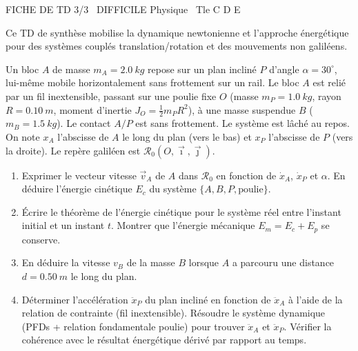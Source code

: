 \documentclass[11pt]{article}
\begin{document}
\begin{tcolorbox}[enhanced,colback=popink,colframe=popink,arc=10pt,boxrule=0pt,left=12pt,right=12pt,top=9pt,bottom=9pt]
{\color{white}\popxbold\small FICHE DE TD 3/3 \textbullet\ DIFFICILE \hfill Physique \textbullet\ Tle C D E\par}
\end{tcolorbox}
\vspace{4pt}
Ce TD de synthèse mobilise la dynamique newtonienne et l'approche énergétique pour des systèmes couplés translation/rotation et des mouvements non galiléens.

\begin{exercice}
Un bloc $A$ de masse $m_A = \SI{2,0}{kg}$ repose sur un plan incliné $P$ d'angle $\alpha = 30^\circ$, lui-même mobile horizontalement sans frottement sur un rail. Le bloc $A$ est relié par un fil inextensible, passant sur une poulie fixe $O$ (masse $m_P = \SI{1,0}{kg}$, rayon $R = \SI{0,10}{m}$, moment d'inertie $J_O = \frac{1}{2}m_P R^2$), à une masse suspendue $B$ ($m_B = \SI{1,5}{kg}$). Le contact $A/P$ est sans frottement. Le système est lâché au repos. On note $x_A$ l'abscisse de $A$ le long du plan (vers le bas) et $x_P$ l'abscisse de $P$ (vers la droite). Le repère galiléen est $\mathcal{R}_0(O, \vec{\imath}, \vec{\jmath})$.
\begin{enumerate}
    \item Exprimer le vecteur vitesse $\vec{v}_A$ de $A$ dans $\mathcal{R}_0$ en fonction de $\dot{x}_A$, $\dot{x}_P$ et $\alpha$. En déduire l'énergie cinétique $E_c$ du système $\{A, B, P, \text{poulie}\}$.
    \item Écrire le théorème de l'énergie cinétique pour le système réel entre l'instant initial et un instant $t$. Montrer que l'énergie mécanique $E_m = E_c + E_p$ se conserve.
    \item En déduire la vitesse $v_B$ de la masse $B$ lorsque $A$ a parcouru une distance $d = \SI{0,50}{m}$ le long du plan.
    \item Déterminer l'accélération $\ddot{x}_P$ du plan incliné en fonction de $\ddot{x}_A$ à l'aide de la relation de contrainte (fil inextensible). Résoudre le système dynamique (PFDs + relation fondamentale poulie) pour trouver $\ddot{x}_A$ et $\ddot{x}_P$. Vérifier la cohérence avec le résultat énergétique dérivé par rapport au temps.
\end{enumerate}
\end{exercice}
\end{document}
